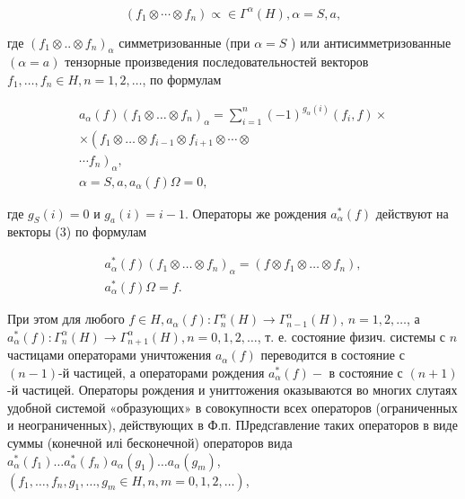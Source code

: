 \documentclass[10pt]{article}
\begin{document}
\[

\left(f_{1} \otimes \cdots \otimes f_{n}\right) \propto \in \Gamma^{\alpha}(H), \alpha=S, a,

\]



где $\left(f_{1} \otimes . . \otimes f_{n}\right)_{\alpha}$ симметризованные (при $\alpha=S$ ) или антисимметризованные $(\alpha=a)$ тензорные произведения последовательностей векторов $f_{1}, \ldots, f_{n} \in H, n=1,2, \ldots$, по формулам



\[

\begin{gathered}

a_{\alpha}(f)\left(f_{1} \otimes \ldots \otimes f_{n}\right)_{\alpha}=\sum_{i=1}^{n}(-1)^{g_{\alpha}(i)}\left(f_{i}, f\right) \times \\

\times\left(f_{1} \otimes \ldots \otimes f_{i-1} \otimes f_{i+1} \otimes \cdots \otimes\right. \\

\left.\cdots f_{n}\right)_{\alpha}, \\

\alpha=S, a, a_{\alpha}(f) \Omega=0,

\end{gathered}

\]



где $g_{S}(i)=0$ и $g_{a}(i)=i-1$. Операторы же рождения $a_{\alpha}^{*}(f)$ действуют на векторы (3) по формулам



\[

\begin{gathered}

a_{\alpha}^{*}(f)\left(f_{1} \otimes \ldots \otimes f_{n}\right)_{\alpha}=\left(f \otimes f_{1} \otimes \ldots \otimes f_{n}\right), \\

a_{\alpha}^{*}(f) \Omega=f .

\end{gathered}

\]



При этом для любого $f \in H, a_{\alpha}(f): \Gamma_{n}^{\alpha}(H) \rightarrow \Gamma_{n-1}^{\alpha}(H)$, $n=1,2, \ldots$, а $a_{\alpha}^{*}(f): \Gamma_{n}^{\alpha}(H) \longrightarrow \Gamma_{n+1}^{\alpha}(H), n=0,1,2, \ldots$, т. е. состояние физич. системы с $n$ частицами операторами уничтожения $a_{\alpha}(f)$ переводится в состояние с $(n-1)$-й частицей, а операторами рождения $a_{\alpha}^{*}(f)-$ в состояние с $(n+1)$-й частицей. Операторы рождения и униттожения оказываются во многих слутаях удобной системой «образующих» в совокупности всех операторов (ограниченных и неограниченных), действующих в Ф.п. ПЈредсґавление таких операторов в виде суммы (конечной илі бесконечной) операторов вида $a_{\alpha}^{*}\left(f_{1}\right) \ldots a_{\alpha}^{*}\left(f_{n}\right) a_{\alpha}\left(g_{1}\right) \ldots a_{\alpha}\left(g_{m}\right)$, $\left(f_{1}, \ldots, f_{n}, g_{1}, \ldots, g_{m} \in H, n, m=0,1,2, \ldots\right)$,
\end{document}
